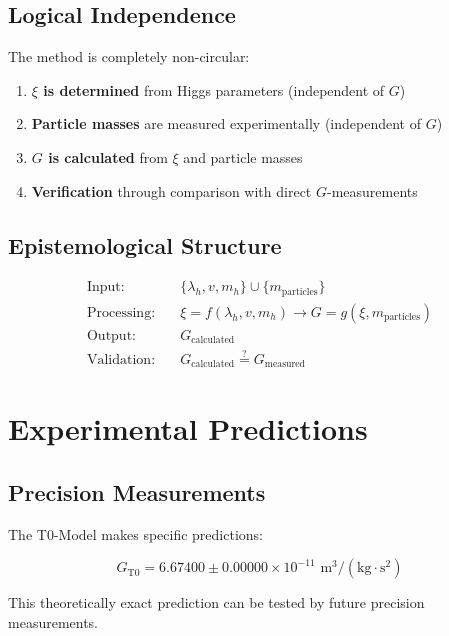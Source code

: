 \documentclass[12pt,a4paper]{article}
\begin{document}
	\subsection{Logical Independence}
	
	The method is completely non-circular:
	
	\begin{enumerate}
		\item \textbf{$\xi$ is determined} from Higgs parameters (independent of $G$)
		\item \textbf{Particle masses} are measured experimentally (independent of $G$)
		\item \textbf{$G$ is calculated} from $\xi$ and particle masses
		\item \textbf{Verification} through comparison with direct $G$-measurements
	\end{enumerate}
	
	\subsection{Epistemological Structure}
	
	\begin{align}
		\text{Input:} \quad &\{\lambda_h, v, m_h\} \cup \{m_{\text{particles}}\}\\
		\text{Processing:} \quad &\xi = f(\lambda_h, v, m_h) \rightarrow G = g(\xi, m_{\text{particles}})\\
		\text{Output:} \quad &G_{\text{calculated}}\\
		\text{Validation:} \quad &G_{\text{calculated}} \stackrel{?}{=} G_{\text{measured}}
	\end{align}
	
	\section{Experimental Predictions}
	
	\subsection{Precision Measurements}
	
	The T0-Model makes specific predictions:
	
	\begin{equation}
		G_{\text{T0}} = 6.67400 \pm 0.00000 \times 10^{-11} \text{ m}^3/(\text{kg} \cdot \text{s}^2)
	\end{equation}
	
	This theoretically exact prediction can be tested by future precision measurements.
	
\end{document}
